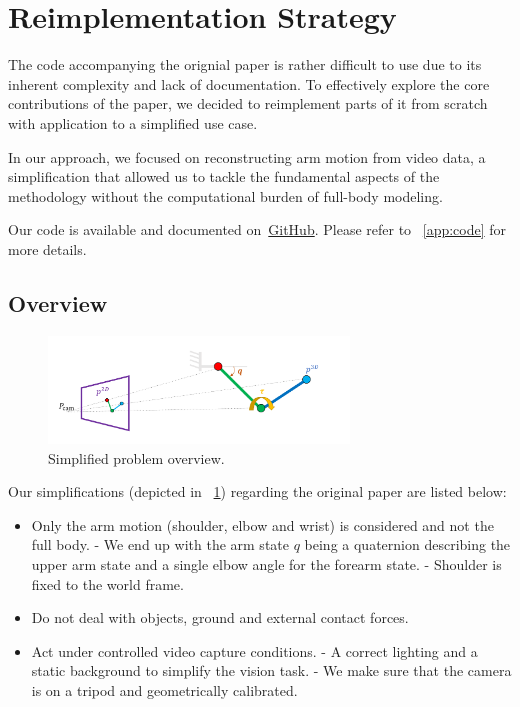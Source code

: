 \section{Reimplementation Strategy}
\label{sec:remplementation}

The code accompanying the orignial paper is rather difficult to use due to its inherent complexity and lack of documentation. 
To effectively explore the core contributions of the paper, 
we decided to reimplement parts of it from scratch with application to a simplified use case.

In our approach, we focused on reconstructing arm motion from video data,
a simplification that allowed us to tackle the fundamental 
aspects of the methodology without the computational burden of full-body modeling.

Our code is available and documented on~\href{https://github.com/balthazarneveu/monocular_pose_and_forces_estimation}{GitHub}.
Please refer to ~\cref{app:code} for more details.

\subsection{Overview}
\label{subsec:overview}


\begin{figure}
    \centering
    \includegraphics[width=8cm]{figures/simplification_overview.png}
    \caption{
    Simplified problem overview.
    }
    \label{fig:simplified_setup}
\end{figure}

Our simplifications (depicted in ~\cref{fig:simplified_setup}) regarding the original paper are listed below:
\begin{itemize}
    \item Only the arm motion (shoulder, elbow and wrist) is considered and not the full body.
    \subitem - We end up with the arm state $q$ being a quaternion describing 
    the upper arm state and a single elbow angle for the forearm state.
    \subitem - Shoulder is fixed to the world frame.
    \item Do not deal with objects, ground and external contact forces.
    \item Act under controlled video capture conditions.
    \subitem - A correct lighting and a static background to simplify the vision task.
    \subitem - We make sure that the camera is on a tripod and geometrically calibrated.
\end{itemize}



